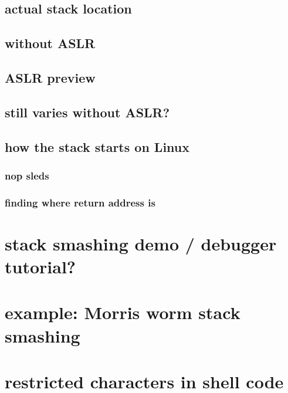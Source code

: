 \subsection{actual stack location}


\subsection{without ASLR}


\subsection{ASLR preview}


\subsection{still varies without ASLR?}



\subsection{how the stack starts on Linux}


\subsubsection{nop sleds}




\subsubsection{finding where return address is}


\section{stack smashing demo / debugger tutorial?}


\section{example: Morris worm stack smashing}



\section{restricted characters in shell code}
   

